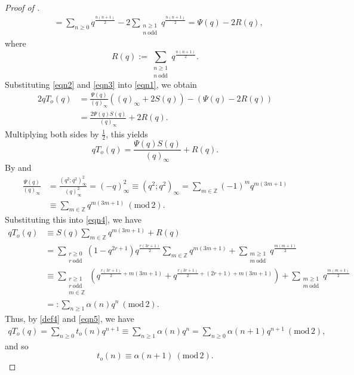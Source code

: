 \documentclass[12pt,reqno]{amsart}
\renewcommand{\a}{\alpha}
\renewcommand{\r}{{\rho}}
\renewcommand{\(}{\left\(}
\renewcommand{\)}{\right\)}
\numberwithin{equation}{section}
\theoremstyle{plain}
\theoremstyle{definition}
\numberwithin{equation}{section}
\renewcommand{\pmod}[1]{\ \left( \mathrm{mod} \, #1 \right)}
\begin{document}
\begin{proof}[Proof of ]
\begin{align}
&=\sum_{n\ge 0} q^{\frac{n(n+1)}{2}}-2\sum_{\substack{n\ge 1\\n\ \text{odd}}} q^{\frac{n(n+1)}{2}}=\Psi(q)-2R(q),
\end{align}
where
\[
R(q):=\sum_{\substack{n\ge 1\\n\ \text{odd}}} q^{\frac{n(n+1)}{2}}.
\]
Substituting \eqref{eqn2} and \eqref{eqn3} into \eqref{eqn1}, we obtain
\begin{align*}
2qT_o(q)&=\frac{\Psi(q)}{(q)_{\infty}}\left((q)_{\infty}+2S(q)\right)-\left(\Psi(q)-2R(q)\right)\nonumber\\
&=\frac{2\Psi(q)S(q)}{(q)_{\infty}}+2R(q).
\end{align*}
Multiplying both sides by $\frac 12$, this yields
\begin{equation}\label{eqn4}
qT_o(q)=\frac{\Psi(q)S(q)}{(q)_{\infty}}+R(q).
\end{equation}
By  and 
\begin{align*}
\frac{\Psi(q)}{(q)_{\infty}}&=\frac{\left(q^2;q^2\right)^2_{\infty}}{(q)^2_{\infty}}=(-q)^2_{\infty}\equiv \left(q^2;q^2\right)_{\infty}%
=\sum_{m\in \mathbb{Z}}(-1)^m q^{m(3m+1)}\\%
&\equiv \sum_{m\in \mathbb{Z}} q^{m(3m+1)}\pmod{2}.
\end{align*}
Substituting this into \eqref{eqn4}, we have
\begin{align}\label{eqn5}
qT_o(q)&\equiv S(q)\sum_{m\in \mathbb{Z}} q^{m(3m+1)}+R(q)\nonumber\\%
&=\sum_{\substack{r\ge 0\\r\ \text{odd}}} \left(1-q^{2r+1}\right)q^{\frac{r(3r+1)}{2}}\sum_{m\in \mathbb{Z}} q^{m(3m+1)}+\sum_{\substack{m\ge 1\\m\ \text{odd}}} q^{\frac{m(m+1)}{2}}\nonumber\\
&\equiv\sum_{\substack{r\ge 1\\r\ \text{odd}\\m\in \mathbb{Z}}}\left(q^{\frac{r(3r+1)}{2}+m(3m+1)}+q^{\frac{r(3r+1)}{2}+(2r+1)+m(3m+1)}\right)+\sum_{\substack{m\ge 1\\m\ \text{odd}}} q^{\frac{m(m+1)}{2}}\nonumber\\
&=:\sum_{n\ge 1}\a(n)q^n\pmod{2}.
\end{align}
Thus, by \eqref{def4} and \eqref{eqn5}, we have
\begin{align*}
qT_o(q)=\sum_{n\ge 0}t_o(n)q^{n+1}\equiv\sum_{n\ge 1}\a(n)q^n= \sum_{n\ge 0}\a(n+1)q^{n+1} \pmod{2},
\end{align*}
and so 
\[
t_o(n)\equiv \a(n+1)\pmod{2}.
\]


\end{proof}
\end{document}
